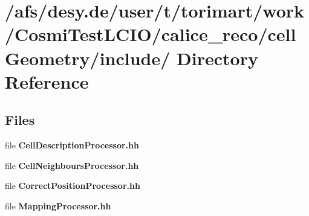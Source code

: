 \section{/afs/desy.de/user/t/torimart/work/CosmiTestLCIO/calice\_\-reco/cellGeometry/include/ Directory Reference}
\label{dir_b3969979156e0a7b1073f3b76691635f}
\subsection*{Files}
\begin{DoxyCompactItemize}
\item 
file {\bfseries CellDescriptionProcessor.hh}
\item 
file {\bfseries CellNeighboursProcessor.hh}
\item 
file {\bfseries CorrectPositionProcessor.hh}
\item 
file {\bfseries MappingProcessor.hh}
\end{DoxyCompactItemize}
